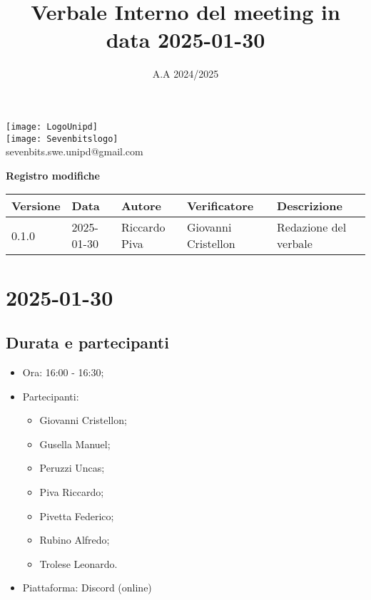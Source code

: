 \documentclass[10pt]{article}
\title{Verbale Interno del meeting in data 2025-01-30}
\date{A.A 2024/2025}
\begin{document}
\maketitle
\begin{center}
\texttt{[image: LogoUnipd]}\\
\texttt{[image: Sevenbitslogo]}\\
sevenbits.swe.unipd@gmail.com\\
\vspace{2mm}

\textbf{Registro modifiche}\\
\vspace{2mm}
\begin{tabularx}{\textwidth}{|l|l|l|l|X|}
\hline
\textbf{Versione} & \textbf{Data} & \textbf{Autore} & \textbf{Verificatore} & \textbf{Descrizione} \\
\hline
0.1.0 & 2025-01-30 & Riccardo Piva & Giovanni Cristellon & Redazione del verbale \\
\hline
\end{tabularx}
\end{center}

\newpage
\tableofcontents
\newpage
\section{2025-01-30}
\subsection{Durata e partecipanti}
\begin{itemize}
\item Ora: 16:00 - 16:30;
\item Partecipanti:
	\begin{itemize}
    	\item Giovanni Cristellon;
		\item Gusella Manuel;
		\item Peruzzi Uncas;
		\item Piva Riccardo;
		\item Pivetta Federico;
		\item Rubino Alfredo;
		\item Trolese Leonardo.
	\end{itemize}
\item Piattaforma: Discord (online)
\end{itemize}
\end{document}
